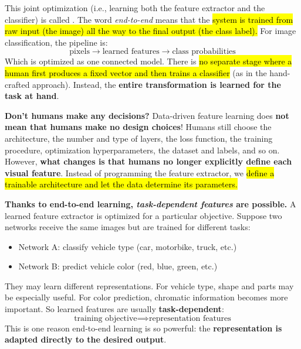 \highspace
This joint optimization (i.e., learning both the feature extractor and the classifier) is called . The word \emph{end-to-end} means that the \hl{system is trained from raw input (the image) all the way to the final output (the class label).} For image classification, the pipeline is:
\begin{equation*}
    \text{pixels} \to \text{learned features} \to \text{class probabilities}
\end{equation*}
Which is optimized as one connected model. There is \hl{no separate stage where a human first produces a fixed vector and then trains a classifier} (as in the hand-crafted approach). Instead, the \textbf{entire transformation is learned for the task at hand}.

\highspace
\textcolor{Red2}{ \textbf{Don't humans make any decisions?}} Data-driven feature learning does \textbf{not mean that humans make no design choices}! Humans still choose the architecture, the number and type of layers, the loss function, the training procedure, optimization hyperparameters, the dataset and labels, and so on. However, \textbf{what changes is that humans no longer explicitly define each visual feature}. Instead of programming the feature extractor, we \hl{define a trainable architecture and let the data determine its parameters.}

\highspace
\textcolor{Green3}{ \textbf{Thanks to end-to-end learning, \emph{task-dependent features} are possible.}} A learned feature extractor is optimized for a particular objective. Suppose two networks receive the same images but are trained for different tasks:
\begin{itemize}
    \item Network A: classify vehicle type (car, motorbike, truck, etc.)
    \item Network B: predict vehicle color (red, blue, green, etc.)
\end{itemize}
They may learn different representations. For vehicle type, shape and parts may be especially useful. For color prediction, chromatic information becomes more important. So learned features are usually \textbf{task-dependent}:
\begin{equation*}
    \text{training objective} \implies \text{representation features}
\end{equation*}
This is one reason end-to-end learning is so powerful: the \textbf{representation is adapted directly to the desired output}.

